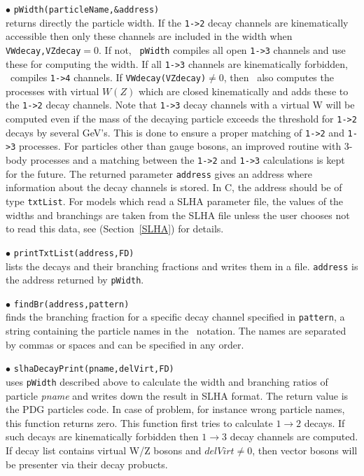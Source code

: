 \documentclass[12pt,a4paper]{article}
\begin{document}
\noindent
$\bullet$ \verb|pWidth(particleName,&address)|\\
returns directly the particle width. If the  \verb|1->2| 
decay channels are kinematically accessible then only these channels are
included in the width when \verb|VWdecay,VZdecay|$ = 0$.  If not, {\tt
pWidth} compiles all open \verb|1->3| channels and use these for  computing the width.
If all \verb|1->3| channels are kinematically forbidden, \micro\ compiles \verb|1->4| channels.
If \verb|VWdecay(VZdecay)|$\ne 0$, then \micro\  also computes the processes with virtual $W(Z)$ which 
are closed kinematically and adds these to the \verb|1->2| decay channels.
 Note that \verb|1->3| decay channels with a virtual W  will be computed even
if the mass of the decaying particle exceeds the threshold for \verb|1->2| decays by several GeV's. This is done to ensure a 
proper matching of \verb|1->2| and \verb|1->3| processes.  For  particles other than gauge bosons,
an improved routine with 3-body processes and a matching  between
the \verb|1->2| and \verb|1->3| calculations is kept for the future. 
The returned  parameter \verb|address| 
gives  an address where information about the decay channels is stored.
In C, the address should be of type {\tt  txtList}.
For models which read a SLHA parameter file, the values of the widths and branchings are taken from the SLHA
file unless the user chooses not to read this data, see (Section~\ref{SLHA}) for details.
  

\noindent
$\bullet$ \verb|printTxtList(address,FD)|\\
lists the decays and their branching fractions and writes them in a file.
{\tt address} is the address returned by {\tt pWidth}.  

\noindent
$\bullet$ \verb|findBr(address,pattern)|\\ 
finds the branching fraction for a specific decay channel specified in
{\tt pattern},  a string containing the particle names 
in the \calchep\ notation. The names are separated by commas or spaces and can be specified in any
order. 

\noindent
$\bullet$ \verb|slhaDecayPrint(pname,delVirt,FD)|\\
uses \verb|pWidth| described above to calculate the width and branching ratios of particle {\it pname} and writes down the result
in SLHA format. The return value is the PDG particles code. In case of problem, for
instance wrong particle names, this function returns zero. This function
first tries to calculate $1\to2$  decays. If such decays are kinematically
forbidden then $1\to3$ decay channels are computed. If decay list contains
virtual W/Z bosons and $delVirt \ne 0$, then  vector bosons will be presenter
via their  decay probucts.
\end{document}
